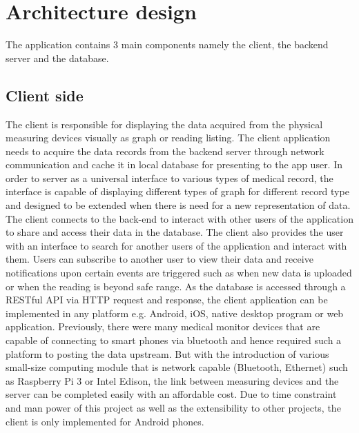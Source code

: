 \section{Architecture design}
\label{sec:Architecture design}
The application contains 3 main components namely the client, the backend server and the database.

\subsection{Client side}
The client is responsible for displaying the data acquired from the physical measuring devices visually as graph or
reading listing. The client application needs to acquire the data records from the backend server through network
communication and cache it in local database for presenting to the app user. In order to server as a universal interface to
various types of medical record, the interface is capable of displaying different types of graph for different record
type and designed to be extended when there is need for a new representation of data. The client connects 
to the back-end to interact with other users of the application to share and access their data in the database. The
client also provides the user with an interface to search for another users of the application and interact with them.
Users can subscribe to another user to view their data and receive notifications upon certain events are triggered such
as when new data is uploaded or when the reading is beyond safe range. As the database is accessed through a RESTful API
via HTTP request and response, the client application can be implemented in any platform e.g. Android, iOS, native
desktop program or web application. Previously, there were many medical monitor devices that are capable of connecting
to smart phones via bluetooth and hence required such a platform to posting the data upstream. But with the introduction
of various small-size computing module that is network capable (Bluetooth, Ethernet) such as Raspberry Pi 3 or Intel
Edison, the link between measuring devices and the server can be completed easily with an affordable cost. Due to time
constraint and man power of this project as well as the extensibility to other projects, the client is only implemented
for Android phones.

